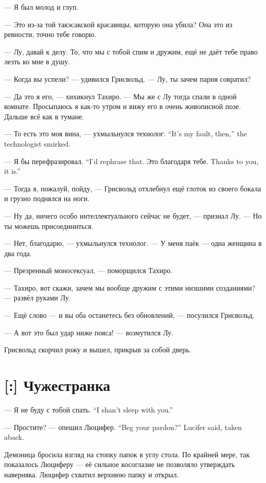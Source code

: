 --- Я был молод и глуп.

--- Это из-за той такэсакской красавицы, которую она убила?
Она это из ревности, точно тебе говорю.

--- Лу, давай к делу.
То, что мы с тобой спим и дружим, ещё не даёт тебе право лезть ко мне в душу.

--- Когда вы успели? --- удивился Грисвольд.
--- Лу, ты зачем парня совратил?

--- Да это я его, --- хихикнул Тахиро.
--- Мы же с Лу тогда спали в одной комнате.
Просыпаюсь я как-то утром и вижу его в очень живописной позе.
Дальше всё как в тумане.

{--- То есть это моя вина, --- ухмыльнулся технолог.}
{``It's my fault, then,'' the technologist smirked.}

{--- Я бы перефразировал.}
{``I'd rephrase that.}
{Это благодаря тебе.}
{Thanks to you, it is.''}

--- Тогда я, пожалуй, пойду, --- Грисвольд отхлебнул ещё глоток из своего бокала и грузно поднялся на ноги.

--- Ну да, ничего особо интеллектуального сейчас не будет, --- признал Лу.
--- Но ты можешь присоединиться.

--- Нет, благодарю, --- ухмыльнулся технолог.
--- У меня паёк --- одна женщина в два года.

--- Презренный моносексуал, --- поморщился Тахиро.

--- Тахиро, вот скажи, зачем мы вообще дружим с этими низшими созданиями? --- развёл руками Лу.

--- Ещё слово --- и вы оба останетесь без обновлений, --- посулился Грисвольд.

--- А вот это был удар ниже пояса! --- возмутился Лу.

Грисвольд скорчил рожу и вышел, прикрыв за собой дверь.

\section{[:] Чужестранка}

{--- Я не буду с тобой спать.}
{``I shan't sleep with you.''}

{--- Простите? --- опешил Люцифер.}
{``Beg your pardon?'' Lucifer said, taken aback.}

Демоница бросила взгляд на стопку папок в углу стола.
По крайней мере, так показалось Люциферу --- её сильное косоглазие не позволяло утверждать наверняка.
Люцифер схватил верхнюю папку и открыл.

